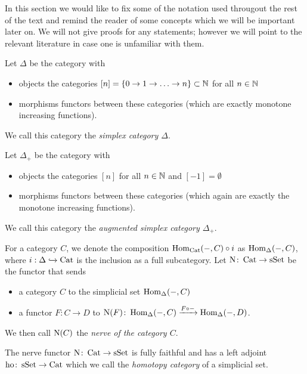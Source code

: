 In this section we would like to fix some of the notation used througout the rest of the text and remind the reader of some concepts which we will be important later on.
We will not give proofs for any statements; however we will point to the relevant literature in case one is unfamiliar with them.
\begin{definition}
    Let $\Delta$ be the category with
    \begin{itemize}
        \item objects the categories $[n]=\{0\to1\to\ldots\to n\}\subset\mathbb{N}$ for all $n\in\mathbb{N}$
        \item morphisms functors between these categories (which are exactly monotone increasing functions).
    \end{itemize}
    We call this category the \emph{simplex category $\Delta$}.
\end{definition}
\begin{definition}
    Let $\Delta_+$ be the category with
    \begin{itemize}
        \item objects the categories $[n]$ for all $n\in\mathbb{N}$ and $[-1]=\emptyset$
        \item morphisms functors between these categories (which again are exactly the monotone increasing functions).
    \end{itemize}
    We call this category the \emph{augmented simplex category $\Delta_+$}.
\end{definition}
\begin{definition}
    For a category $C$, we denote the composition $\operatorname{Hom}_{\operatorname{Cat}}(-,C)\circ i$ as $\operatorname{Hom}_{\Delta}(-,C)$, where $i:\Delta\xhookrightarrow{}\operatorname{Cat}$ is the inclusion as a full subcategory.
    Let $\operatorname{N}\colon\operatorname{Cat}\to\operatorname{sSet}$ be the functor that sends
    \begin{itemize}
        \item a category $C$ to the simplicial set $\operatorname{Hom}_{\Delta}(-,C)$
        \item a functor $F:C\to D$ to $\operatorname{N}(F)\colon\operatorname{Hom}_{\Delta}(-,C)\xrightarrow{F\circ -}\operatorname{Hom}_{\Delta}(-,D)$\;.
    \end{itemize}
    We then call $\operatorname{N}(C)$ the \emph{nerve of the category $C$}.
\end{definition}
\begin{lemma} %
    The nerve functor $\operatorname{N}\colon\operatorname{Cat}\to\operatorname{sSet}$ is fully faithful and has a left adjoint $\operatorname{ho}\colon\operatorname{sSet}\to\operatorname{Cat}$ which we call the \emph{homotopy category} of a simplicial set.
\end{lemma}
